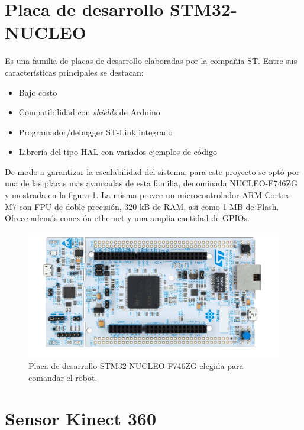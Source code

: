 \section{Placa de desarrollo STM32-NUCLEO}

Es una familia de placas de desarrollo elaboradas por la compañía ST. Entre sus características principales se destacan:

\begin{itemize}
    \item Bajo costo
    \item Compatibilidad con \textit{shields} de Arduino
    \item Programador/debugger ST-Link integrado
    \item Librería del tipo HAL con variados ejemplos de código
\end{itemize}

De modo a garantizar la escalabilidad del sistema, para este proyecto se optó por una de las placas mas avanzadas de esta familia, denominada NUCLEO-F746ZG y mostrada en la figura \ref{fig:stm32nucleo}. La misma provee un microcontrolador ARM Cortex-M7 con FPU de doble precisión, 320 kB de RAM, así como 1 MB de Flash. Ofrece además conexión ethernet y una amplia cantidad de GPIOs.

\begin{figure}[ht]
    \centering
    \includegraphics[scale=1.5]{./Figures/stm32nucleo.png}
    \caption{Placa de desarrollo STM32 NUCLEO-F746ZG elegida para comandar el robot.\protect\footnotemark}
    \label{fig:stm32nucleo}
\end{figure}


\section{Sensor Kinect 360}

